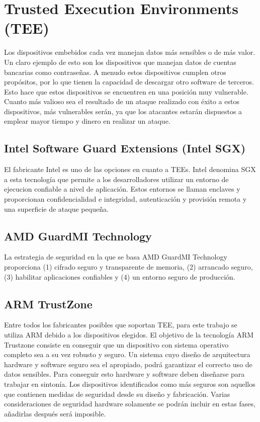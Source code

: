 \section{Trusted Execution Environments (TEE)}

Los dispositivos embebidos cada vez manejan datos más sensibles o de más valor. Un claro ejemplo de esto son los dispositivos que manejan datos de cuentas bancarias como contraseñas. A menudo estos dispositivos cumplen otros propósitos, por lo que tienen la capacidad de descargar otro software de terceros. Esto hace que estos dispositivos se encuentren en una posición muy vulnerable. Cuanto más valioso sea el resultado de un ataque realizado con éxito a estos dispositivos, más vulnerables serán, ya que los atacantes estarán dispuestos a emplear mayor tiempo y dinero en realizar un ataque. \newline

\subsection{Intel Software Guard Extensions (Intel SGX)}
El fabricante Intel es uno de las opciones en cuanto a TEEs. Intel denomina SGX \cite{intel} a esta tecnología que permite a los desarrolladores utilizar un entorno de ejecucion confiable a nivel de aplicación. Estos entornos se llaman enclaves y proporcionan confidencialidad e integridad, autenticación y provisión remota y una superficie de ataque pequeña.

\subsection{AMD GuardMI Technology}
La estrategia de seguridad en la que se basa AMD GuardMI Technology \cite{amd} proporciona (1) cifrado seguro y transparente de memoria, (2) arrancado seguro, (3) habilitar aplicaciones confiables y (4) un entorno seguro de producción.

\subsection{ARM TrustZone}

Entre todos los fabricantes posibles que soportan TEE, para este trabajo se utiliza ARM debido a los dispositivos elegidos. El objetivo de la tecnología ARM Trustzone consiste en conseguir que un dispositivo con sistema operativo completo sea a su vez robusto y seguro. Un sistema cuyo diseño de arquitectura hardware y software seguro sea el apropiado, podrá garantizar el correcto uso de datos sensibles. Para conseguir esto hardware y software deben diseñarse para trabajar en sintonía. Los dispositivos identificados como más seguros son aquellos que contienen medidas de seguridad desde su diseño y fabricación. Varias consideraciones de seguridad hardware solamente se podrán incluir en estas fases, añadirlas después será imposible. \newline


